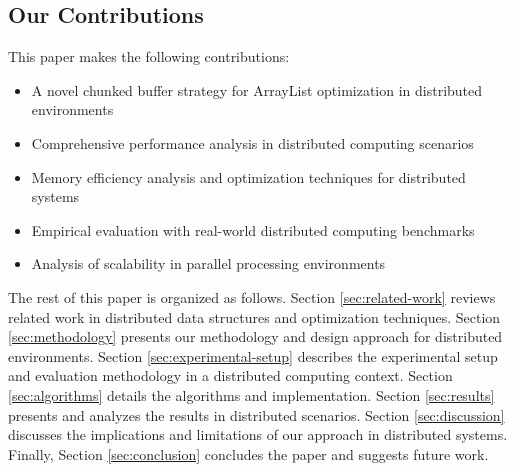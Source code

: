 \subsection{Our Contributions}

This paper makes the following contributions:
\begin{itemize}
    \item A novel chunked buffer strategy for ArrayList optimization in distributed environments
    \item Comprehensive performance analysis in distributed computing scenarios
    \item Memory efficiency analysis and optimization techniques for distributed systems
    \item Empirical evaluation with real-world distributed computing benchmarks
    \item Analysis of scalability in parallel processing environments
\end{itemize}

The rest of this paper is organized as follows. Section \ref{sec:related-work} reviews related work in distributed data structures and optimization techniques. Section \ref{sec:methodology} presents our methodology and design approach for distributed environments. Section \ref{sec:experimental-setup} describes the experimental setup and evaluation methodology in a distributed computing context. Section \ref{sec:algorithms} details the algorithms and implementation. Section \ref{sec:results} presents and analyzes the results in distributed scenarios. Section \ref{sec:discussion} discusses the implications and limitations of our approach in distributed systems. Finally, Section \ref{sec:conclusion} concludes the paper and suggests future work. 